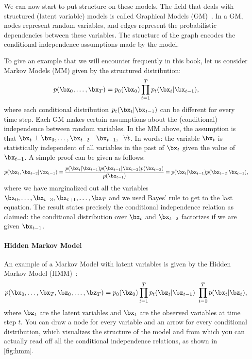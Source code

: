 \documentclass{lecture}
\begin{document}
We can now start to put structure on these models. The field that deals with structured (latent variable) models is called Graphical Models (GM)~\cite{Koller2009Probabilistic}. In a GM, nodes represent random variables, and edges represent the probabilistic dependencies between these variables. The structure of the graph encodes the conditional independence assumptions made by the model.

To give an example that we will encounter frequently in this book, let us consider Markov Models (MM) given by the structured distribution:
\begin{align}
	p(\bx_0,\ldots,\bx_T) = p_0(\bx_0)\prod_{t=1}^T p_t(\bx_t|\bx_{t-1}),
\end{align}
where each conditional distribution $p_t(\bx_t|\bx_{t-1})$ can be different for every time step. Each GM makes certain assumptions about the (conditional) independence between random variables. In the MM above, the assumption is that $\bx_t\perp \bx_0,\ldots,\bx_{t-2}~|~\bx_{t-1},~~\forall t$. In words: the variable $\bx_t$ is statistically independent of all variables in the past of $\bx_t$ given the value of $\bx_{t-1}$. A simple proof can be given as follows:
\begin{align}
	p(\bx_t,\bx_{t-2}|\bx_{t-1}) = \frac{p(\bx_t|\bx_{t-1})p(\bx_{t-1}|\bx_{t-2})p(\bx_{t-2})}{p(\bx_{t-1})} = p(\bx_t|\bx_{t-1}) p(\bx_{t-2}|\bx_{t-1}),
\end{align}
where we have marginalized out all the variables $\bx_0,\ldots,\bx_{t-3},\bx_{t+1},\ldots,\bx_T$ and we used Bayes' rule to get to the last equation. The result states precisely the conditional independence relation as claimed: the conditional distribution over $\bx_t$ and $\bx_{t-2}$ factorizes if we are given $\bx_{t-1}$.


\paragraph{Hidden Markov Model}
An example of a Markov Model with latent variables is given by the Hidden Markov Model (HMM)~\cite{Rabiner1989Tutorial}:
\begin{align}
	p(\bx_0,\ldots,\bx_T,\bz_0,\ldots,\bz_T)=p_0(\bz_0)\prod_{t=1}^T p_t(\bz_t|\bz_{t-1})~\prod_{t=0}^T p(\bx_t|\bz_t),
\end{align}
where $\bz_t$ are the latent variables and $\bx_t$ are the observed variables at time step $t$. You can draw a node for every variable and an arrow for every conditional distribution, which visualizes the structure of the model and from which you can actually read off all the conditional independence relations, as shown in \cref{fig:hmm}.
\end{document}
